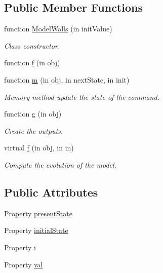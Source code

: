 \subsection*{Public Member Functions}
\begin{DoxyCompactItemize}
\item 
function \hyperlink{class_model_walls_a5aa5cfd2186c06e8ab37ce531b1a9720}{Model\+Walls} (in init\+Value)
\begin{DoxyCompactList}\small\item\em Class constructor. \end{DoxyCompactList}\item 
function \hyperlink{class_model_walls_af07620c51528eb1e504befcf52ca0cee}{f} (in obj)
\item 
function \hyperlink{class_model_walls_a3140f24c6c4b80037b7d4f521c6ae2d3}{m} (in obj, in next\+State, in init)
\begin{DoxyCompactList}\small\item\em Memory method update the state of the command. \end{DoxyCompactList}\item 
function \hyperlink{class_model_walls_a07dadfabe92bf9a144b8a862720e7746}{g} (in obj)
\begin{DoxyCompactList}\small\item\em Create the outputs. \end{DoxyCompactList}\item 
virtual \hyperlink{class_model_s_e_d_ac36f9451c43b120828af4380858f2024}{f} (in obj, in in)
\begin{DoxyCompactList}\small\item\em Compute the evolution of the model. \end{DoxyCompactList}\end{DoxyCompactItemize}
\subsection*{Public Attributes}
\begin{DoxyCompactItemize}
\item 
Property \hyperlink{class_model_walls_a9624cc7c421a50fa5086b0ebd0cd5fe3}{present\+State}
\item 
Property \hyperlink{class_model_walls_acd9263acfa96c9138afdf497e55acc24}{initial\+State}
\item 
Property \hyperlink{class_model_walls_a103c618d75e54c3a72fac6bcaa59f61f}{i}
\item 
Property \hyperlink{class_model_walls_aae3a423b8c844683e2adba0472347fe1}{val}
\end{DoxyCompactItemize}


